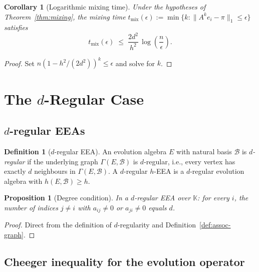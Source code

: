 \documentclass[12pt,a4paper]{amsart}
\newtheorem{proposition}[theorem]{Proposition}
\newtheorem{corollary}[theorem]{Corollary}
\theoremstyle{definition}
\newtheorem{definition}[theorem]{Definition}
\newcommand{\K}{\mathbb{K}}
\newcommand{\hh}{h}          %
\newcommand{\EA}{E}          %
\newcommand{\natbasis}{\mathcal{B}}  %
\newcommand{\strmat}{A}      %
\begin{document}
\begin{corollary}[Logarithmic mixing time]\label{cor:mixing-time}
Under the hypotheses of Theorem~\ref{thm:mixing}, the mixing time
$t_\mathrm{mix}(\epsilon):=\min\{k:\|\strmat^k e_i-\pi\|_1\le\epsilon\}$
satisfies
\[
  t_\mathrm{mix}(\epsilon)
  \;\le\;
  \frac{2d^2}{h^2}\,\log\!\left(\frac{n}{\epsilon}\right).
\]
\end{corollary}

\begin{proof}
Set $n(1-h^2/(2d^2))^k\le\epsilon$ and solve for $k$.
\end{proof}

\section{The $d$-Regular Case}\label{sec:regular}

\subsection{$d$-regular EEAs}

\begin{definition}[$d$-regular EEA]\label{def:d-regular}
An evolution algebra $\EA$ with natural basis $\natbasis$ is
\emph{$d$-regular} if the underlying graph $\varGamma(\EA,\natbasis)$ is
$d$-regular, i.e., every vertex has exactly $d$ neighbours in
$\varGamma(\EA,\natbasis)$.  A $d$-regular $h$-EEA is a $d$-regular
evolution algebra with $\hh(\EA,\natbasis)\ge h$.
\end{definition}

\begin{proposition}[Degree condition]\label{prop:degree-cond}
In a $d$-regular EEA over $\K$: for every $i$, the number of indices
$j\ne i$ with $a_{ij}\ne 0$ or $a_{ji}\ne 0$ equals $d$.
\end{proposition}

\begin{proof}
Direct from the definition of $d$-regularity and
Definition~\ref{def:assoc-graph}.
\end{proof}

\subsection{Cheeger inequality for the evolution operator}
\end{document}
